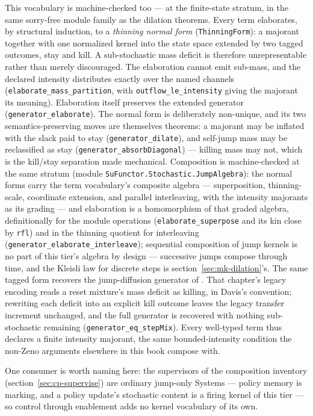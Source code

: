 This vocabulary is machine-checked too --- at the finite-state
stratum, in the same sorry-free module family as the dilation
theorems. Every
term elaborates, by structural induction, to a \emph{thinning normal
form} (\texttt{ThinningForm}): a majorant together with one
normalized kernel into the state space extended by two tagged
outcomes, stay and kill. A sub-stochastic mass deficit is therefore
unrepresentable rather than merely discouraged. The elaboration
cannot emit sub-mass, and the declared intensity distributes exactly
over the named channels (\texttt{elaborate\_mass\_partition}, with
\texttt{outflow\_le\_intensity} giving the majorant its meaning).
Elaboration itself preserves the extended generator
(\texttt{generator\_elaborate}). The normal form is deliberately
non-unique, and its two semantics-preserving moves are themselves
theorems: a majorant may be inflated with the slack paid to stay
(\texttt{generator\_dilate}), and self-jump mass may be reclassified
as stay (\texttt{generator\_absorbDiagonal}) --- killing mass may
not, which is the kill/stay separation made mechanical. Composition
is machine-checked at the same stratum (module
\texttt{SuFunctor.Stochastic.JumpAlgebra}): the normal forms carry
the term vocabulary's composite algebra --- superposition,
thinning-scale, coordinate extension, and parallel interleaving, with
the intensity majorants as its grading --- and elaboration is a
homomorphism of that graded algebra, definitionally for the module
operations (\texttt{elaborate\_superpose} and its kin close by
\texttt{rfl}) and in the thinning quotient for interleaving
(\texttt{generator\_elaborate\_interleave}); sequential composition
of jump kernels is no part of this tier's algebra by design ---
successive jumps compose through time, and the Kleisli law for
discrete steps is section~\ref{sec:mk-dilation}'s. The same
tagged form recovers the jump-diffusion generator of
. That
chapter's legacy encoding reads a reset mixture's mass deficit as
killing, in Davis's convention; rewriting each deficit into an
explicit kill outcome leaves the legacy transfer increment
unchanged, and the full generator is recovered with nothing
sub-stochastic remaining (\texttt{generator\_eq\_stepMix}). Every
well-typed term thus declares a finite intensity majorant, the same
bounded-intensity condition the non-Zeno arguments elsewhere in this
book compose with.

One consumer is worth naming here: the supervisors of the composition
inventory (section~\ref{sec:cp-supervise}) are ordinary jump-only
Systems --- policy memory is marking, and a policy update's
stochastic content is a firing kernel of this tier --- so control
through enablement adds no kernel vocabulary of its own.

